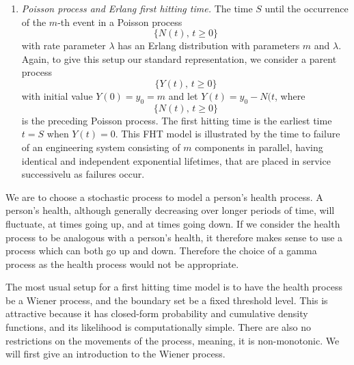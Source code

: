 \begin{enumerate}
    \item
        \textit{Poisson process and Erlang first hitting time.}
        The time $S$ until the occurrence of the $m$-th event in a Poisson process
        \begin{equation*}
            \{N(t),\,t\geq 0\}
        \end{equation*}
        with rate parameter $\lambda$ has an Erlang distribution with parameters $m$ and $\lambda$.
        Again, to give this setup our standard representation, we consider a parent process
        \begin{equation*}
            \{Y(t),\,t\geq 0\}
        \end{equation*}
        with initial value $Y(0)=y_0=m$ and let $Y(t)=y_0-N(t$, where
        \begin{equation*}
            \{N(t),\,t\geq 0\}
        \end{equation*}
        is the preceding Poisson process.
        The first hitting time is the earliest time $t=S$ when $Y(t)=0$.
        This FHT model is illustrated by the time to failure of an engineering system consisting of $m$ components in parallel, having identical and independent exponential lifetimes, that are placed in service successivelu as failures occur.
\end{enumerate}
We are to choose a stochastic process to model a person's health process.
A person's health, although generally decreasing over longer periods of time, will fluctuate, at times going up, and at times going down.
If we consider the health process to be analogous with a person's health, it therefore makes sense to use a process which can both go up and down.
Therefore the choice of a gamma process as the health process would not be appropriate.

The most usual setup for a first hitting time model is to have the health process be a Wiener process, and the boundary set be a fixed threshold level.
This is attractive because it has closed-form probability and cumulative density functions, and its likelihood is computationally simple. 
There are also no restrictions on the movements of the process, meaning, it is non-monotonic.
We will first give an introduction to the Wiener process.

